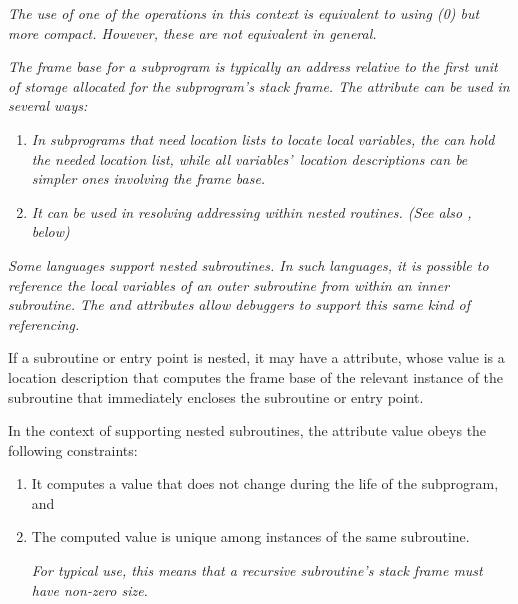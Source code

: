 \textit{The use of one of the \DWOPregn{} 
operations in this context is equivalent to using 
\DWOPbregn(0) but more
compact. However, these are not equivalent in general.}

\textit{The frame base for a subprogram is typically an address
relative to the first unit of storage allocated for the
subprogram\textquoteright s stack frame. The \DWATframebase{} attribute
can be used in several ways:}
\begin{enumerate}[1. ]
\item \textit{In subprograms that need 
location lists to locate local
variables, the \DWATframebase{} can hold the needed location
list, while all variables\textquoteright\  location descriptions can be
simpler ones involving the frame base.}

\item \textit{It can be used in resolving  addressing
within nested routines. 
(See also \DWATstaticlink, below)}
\end{enumerate}

\textit{Some languages support nested subroutines. In such languages,
it is possible to reference the local variables of an
outer subroutine from within an inner subroutine. The
\DWATstaticlink{} and \DWATframebase{} attributes allow
debuggers to support this same kind of referencing.}

If\hypertarget{chap:DWATstaticlinklocationofuplevelframe}{}
a subroutine or entry point is nested, it may have a
\DWATstaticlinkDEFN{} attribute, whose value is a location
description that computes the frame base of the relevant
instance of the subroutine that immediately encloses the
subroutine or entry point.

In the context of supporting nested subroutines, the
\DWATframebase{} attribute value obeys the following constraints:

\begin{enumerate}[1. ]
\item 
It computes a value that does not change during the
life of the subprogram, and

\item The computed value is unique among instances of
the same subroutine. 

\textit{For typical \DWATframebase{} use, this
means that a recursive subroutine\textquoteright s stack frame must have
non-zero size.}

\end{enumerate}

